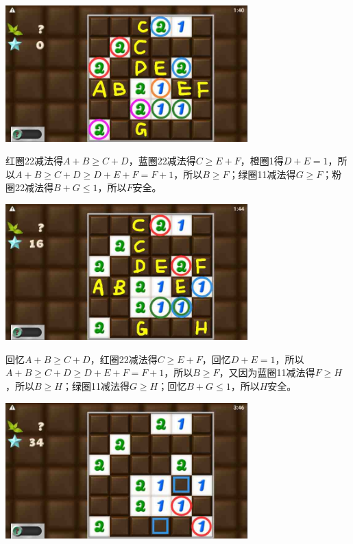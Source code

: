 \subsection{} %
\begin{center}
    \includegraphics[width=0.7\textwidth]{puzzlelow/242-1.jpg}
\end{center}
红圈22减法得$A+B\ge C+D$，蓝圈22减法得$C\ge E+F$，橙圈1得$D+E=1$，所以$A+B\ge C+D\ge D+E+F=F+1$，所以$B\ge F$；绿圈11减法得$G\ge F$；粉圈22减法得$B+G\le 1$，所以$F$安全。
\begin{center}
    \includegraphics[width=0.7\textwidth]{puzzlelow/242-2.jpg}
\end{center}
回忆$A+B\ge C+D$，红圈22减法得$C\ge E+F$，回忆$D+E=1$，所以$A+B\ge C+D\ge D+E+F=F+1$，所以$B\ge F$，又因为蓝圈11减法得$F\ge H$，所以$B\ge H$；绿圈11减法得$G\ge H$；回忆$B+G\le 1$，所以$H$安全。
\begin{center}
    \includegraphics[width=0.7\textwidth]{puzzlelow/242-3.jpg}
\end{center}
